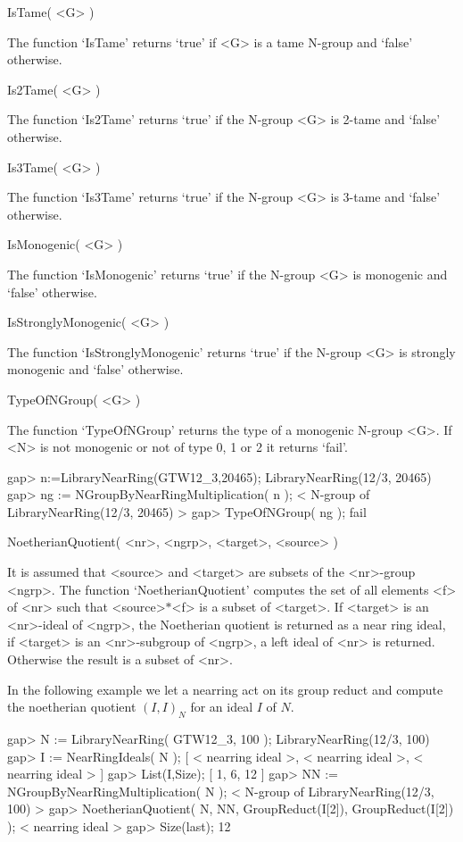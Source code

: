 \>IsTame( <G> )

The function `IsTame' returns `true' if <G> is a tame N-group
and `false' otherwise.

\>Is2Tame( <G> )

The function `Is2Tame' returns `true' if the N-group <G> is 2-tame
and `false' otherwise.

\>Is3Tame( <G> )

The function `Is3Tame' returns `true' if the N-group <G> is 3-tame
and `false' otherwise.

\>IsMonogenic( <G> )

The function `IsMonogenic' returns `true' if the N-group <G> is monogenic
and `false' otherwise.

\>IsStronglyMonogenic( <G> )

The function `IsStronglyMonogenic' returns `true' if the N-group <G> is
strongly monogenic and `false' otherwise.

\>TypeOfNGroup( <G> )

The function `TypeOfNGroup' returns the type of a monogenic N-group <G>. If
<N> is not monogenic or not of type 0, 1 or 2 it returns `fail'.

\beginexample
    gap> n:=LibraryNearRing(GTW12_3,20465);
    LibraryNearRing(12/3, 20465)
    gap> ng := NGroupByNearRingMultiplication( n );
    < N-group of LibraryNearRing(12/3, 20465) >
    gap> TypeOfNGroup( ng );
    fail
\endexample



\>NoetherianQuotient( <nr>, <ngrp>, <target>, <source> )

It is assumed that <source> and <target> are subsets of the <nr>-group
<ngrp>. The function `NoetherianQuotient' computes the set of all
elements <f> of <nr> such that <source>$*$<f> is a subset of <target>.
If <target> is an <nr>-ideal of <ngrp>, the Noetherian quotient is
returned as a near ring ideal, if <target> is an <nr>-subgroup of
<ngrp>, a left ideal of <nr> is returned. Otherwise the result is a
subset of <nr>.

In the following example we let a nearring act on its group reduct and
compute the noetherian quotient $(I,I)_N$ for an ideal $I$ of $N$.

\beginexample
    gap> N := LibraryNearRing( GTW12_3, 100 );
    LibraryNearRing(12/3, 100)
    gap> I := NearRingIdeals( N );            
    [ < nearring ideal >, < nearring ideal >, < nearring ideal > ]
    gap> List(I,Size);
    [ 1, 6, 12 ]
    gap> NN := NGroupByNearRingMultiplication( N );
    < N-group of LibraryNearRing(12/3, 100) >
    gap> NoetherianQuotient( N, NN, GroupReduct(I[2]), GroupReduct(I[2]) );
    < nearring ideal >
    gap> Size(last);
    12
\endexample

